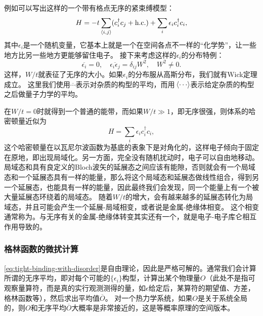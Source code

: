 例如可以写出这样的一个带有格点无序的紧束缚模型：
\begin{equation}
    {H} = - t \sum_{\langle i, j \rangle} ({c}_i^\dagger {c}_j + \text{h.c.}) + \sum_i \epsilon_i {c}_i^\dagger {c}_i,
    \label{eq:tight-binding-with-disorder}
\end{equation}
其中$\epsilon_i$是一个随机变量，它基本上就是一个在空间各点不一样的“化学势”，让一些地方比另一些地方更能够留住电子。
接下来考虑这样的$\epsilon_i$的分布特例：
\begin{equation}
    \overline{\epsilon_i} = 0, \quad \overline{\epsilon_i \epsilon_j} = \delta_{ij} W^2 , \quad W^2 \neq 0.
\end{equation}
这样，$W/t$就表征了无序的大小。如果$\epsilon_i$的分布服从高斯分布，我们就有Wick定理成立。
这里我们使用$\overline{\cdots}$表示对杂质的构型的平均，而用$\expval*{\cdots}$表示给定杂质的构型之后做量子力学的平均。

在$W/t=0$时就得到一个普通的能带，而如果$W/t \gg 1$，即无序很强，则体系的哈密顿量近似为
\[
    {H} = \sum_i \epsilon_i {c}_i^\dagger {c}_i,
\]
这个哈密顿量在以瓦尼尔波函数为基底的表象下是对角化的，这样电子倾向于固定在原地，即出现局域化。另一方面，完全没有随机扰动时，电子可以自由地移动。
局域态和具有良定义的Bloch波矢的延展态之间应该有能隙，否则就会有一个局域态和一个延展态具有一样的能量，那么将这个局域态和延展态做线性组合，得到另一个延展态，也能具有一样的能量，因此最终我们会发现，同一个能量上有一个被大量延展态环绕着的局域态。
随着$W/t$的增大，会有越来越多的延展态转化为局域态，并且可能会产生一个延展-局域相变，或者说是金属-绝缘体相变。
这个相变通常称为。与无序有关的金属-绝缘体转变其实还有一个，就是电子-电子库仑相互作用导致的。%

\subsubsection{格林函数的微扰计算}

\eqref{eq:tight-binding-with-disorder}是自由理论，因此是严格可解的。通常我们会计算所谓的无序平均，即对每个可能的$\{\epsilon_i\}$构型，计算出某个物理量$O$（此处不是指可观察量算符，而是真的实行观测测得的量，如$\epsilon$给定后，某算符的期望值、方差，格林函数等），然后求出平均值$\overline{O}$。
对一个热力学系统，如果$O$是关于系统全局的，则$O$和无序平均$\overline{O}$大概率是非常接近的，这是等概率原理的空间版本。

